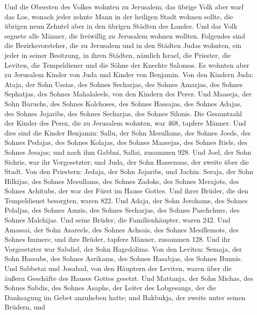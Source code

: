  Und die Obersten des Volkes wohnten zu Jerusalem; das
übrige Volk aber warf das Los, wonach jeder zehnte Mann in der heiligen
Stadt wohnen sollte, die übrigen neun Zehntel aber in den übrigen
Städten des Landes.  Und das Volk segnete alle Männer, die
freiwillig zu Jerusalem wohnen wollten.  Folgendes sind
die Bezirksvorsteher, die zu Jerusalem und in den Städten Judas wohnten,
ein jeder in seiner Besitzung, in ihren Städten, nämlich Israel, die
Priester, die Leviten, die Tempeldiener und die Söhne der Knechte
Salomos.  Es wohnten aber zu Jerusalem Kinder von Juda und
Kinder von Benjamin. Von den Kindern Juda: Ataja, der Sohn Ussias, des
Sohnes Secharjas, des Sohnes Amarjas, des Sohnes Sephatjas, des Sohnes
Mahalaleels, von den Kindern des Perez.  Und Maaseja, der
Sohn Baruchs, des Sohnes Kolchoses, des Sohnes Hassajas, des Sohnes
Adajas, des Sohnes Jojaribs, des Sohnes Secharjas, des Sohnes Silonis.
 Die Gesamtzahl der Kinder des Perez, die zu Jerusalem
wohnten, war 468, tapfere Männer.  Und dies sind die
Kinder Benjamin: Sallu, der Sohn Mesullams, des Sohnes Joeds, des Sohnes
Pedajas, des Sohnes Kolajas, des Sohnes Maasejas, des Sohnes Itiels, des
Sohnes Jesajas;  und nach ihm Gabbai, Sallai, zusammen
928.  Und Joel, der Sohn Sichris, war ihr Vorgesetzter;
und Juda, der Sohn Hassenuas, der zweite über die Stadt. 
Von den Priestern: Jedaja, der Sohn Jojaribs, und Jachin.
 Seraja, der Sohn Hilkijas, des Sohnes Mesullams, des
Sohnes Zadoks, des Sohnes Merajots, des Sohnes Achitubs, der war der
Fürst im Hause Gottes.  Und ihrer Brüder, die den
Tempeldienst besorgten, waren 822. Und Adaja, der Sohn Jerohams, des
Sohnes Pelaljas, des Sohnes Amzis, des Sohnes Secharjas, des Sohnes
Paschchurs, des Sohnes Malchijas.  Und seine Brüder, die
Familienhäupter, waren 242. Und Amassai, der Sohn Asareels, des Sohnes
Achsais, des Sohnes Mesillemots, des Sohnes Immers;  und
ihre Brüder, tapfere Männer, zusammen 128. Und ihr Vorgesetzter war
Sabdiel, der Sohn Hagedolims.  Von den Leviten: Semaja,
der Sohn Hassubs, des Sohnes Asrikams, des Sohnes Hasabjas, des Sohnes
Bunnis.  Und Sabbetai und Josabad, von den Häuptern der
Leviten, waren über die äußern Geschäfte des Hauses Gottes gesetzt.
 Und Mattanja, der Sohn Michas, des Sohnes Sabdis, des
Sohnes Asaphs, der Leiter des Lobgesangs, der die Danksagung im Gebet
anzuheben hatte; und Bakbukja, der zweite unter seinen Brüdern, und
